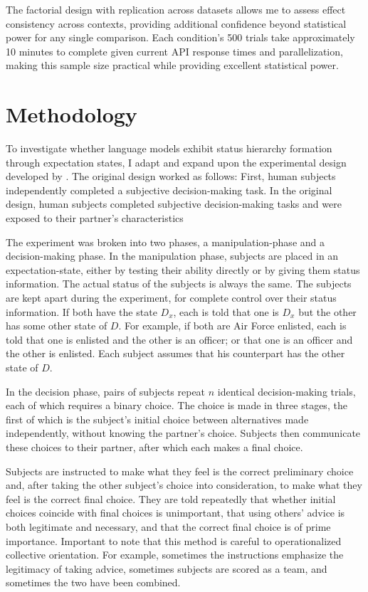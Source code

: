The factorial design with replication across datasets allows me to assess effect consistency across contexts, providing additional confidence beyond statistical power for any single comparison. Each condition's 500 trials take approximately 10 minutes to complete given current API response times and parallelization, making this sample size practical while providing excellent statistical power.




\section{Methodology}

To investigate whether language models exhibit status hierarchy formation through expectation states, I adapt and expand upon the experimental design developed by \citet{Berger-1972-Status}. The original design worked as follows: First, human subjects independently completed a subjective decision-making task. In the original design, human subjects completed subjective decision-making tasks and were exposed to their partner's characteristics

The experiment was broken into two phases, a manipulation-phase and a decision-making phase. In the manipulation phase, subjects are placed in an expectation-state, either by testing their ability directly or by giving them status information. The actual status of the subjects is always the same. The subjects are kept apart during the experiment, for complete control over their status information. If both have the state $D_x$, each is told that one is $D_x$ but the other has some other state of $D$. For example, if both are Air Force enlisted, each is told that one is enlisted and the other is an officer; or that one is an officer and the other is enlisted. Each subject assumes that his counterpart has the other state of $D$.

In the decision phase, pairs of subjects repeat $n$ identical decision-making trials, each of which requires a binary choice. The choice is made in three stages, the first of which is the subject's initial choice between alternatives made independently, without knowing the partner's choice. Subjects then communicate these choices to their partner, after which each makes a final choice.

Subjects are instructed to make what they feel is the correct preliminary choice and, after taking the other subject's choice into consideration, to make what they feel is the correct final choice. They are told repeatedly that whether initial choices coincide with final choices is unimportant, that using others' advice is both legitimate and necessary, and that the correct final choice is of prime importance. Important to note that this method is careful to operationalized collective orientation. For example, sometimes the instructions emphasize the legitimacy of taking advice, sometimes subjects are scored as a team, and sometimes the two have been combined. 

